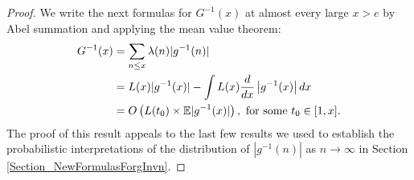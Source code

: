 \documentclass[11pt,reqno,a4letter]{article}
\numberwithin{figure}{section}
\numberwithin{table}{section}
\theoremstyle{plain}
\numberwithin{theorem}{section}
\theoremstyle{definition}
\begin{document}
\begin{proof} 
We write the next formulas for $G^{-1}(x)$ at almost every large $x > e$ 
by Abel summation and applying the mean value theorem: 
\begin{align} 
\notag 
G^{-1}(x) & = \sum_{n \leq x} \lambda(n) |g^{-1}(n)| \\ 
\notag
     & = L(x) |g^{-1}(x)| - \int L(x) \frac{d}{dx}\left\lvert g^{-1}(x) \right\rvert dx \\ 
\label{proof_tag_GInvx_LxAbelSummationIntFormula_v1} 
     & = O\left(L(t_0) \times \mathbb{E}|g^{-1}(x)|\right), \mathrm{\ for\ some\ } t_0 \in [1, x]. 
\end{align} 
The proof of this result appeals to the 
last few results we used to establish the 
probabilistic interpretations of the distribution of $|g^{-1}(n)|$ as 
$n \rightarrow \infty$ in 
Section \ref{Section_NewFormulasForgInvn}. 


\end{proof}
\end{document}
